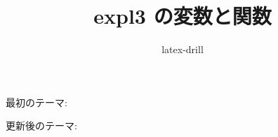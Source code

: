 \documentclass{jlreq}
\begin{document}
\title{expl3 の変数と関数}
\author{latex-drill}
\maketitle

最初のテーマ: \DrillPrintTopic

更新後のテーマ: \DrillPrintTopic
\end{document}
